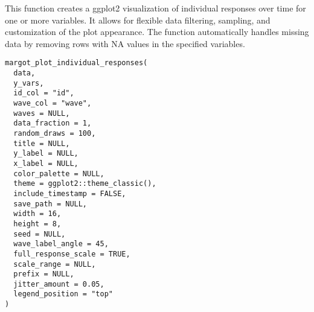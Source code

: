 \documentclass[a4paper]{book}
\begin{document}
%
\begin{Description}
This function creates a ggplot2 visualization of individual responses over time for one or more variables.
It allows for flexible data filtering, sampling, and customization of the plot appearance.
The function automatically handles missing data by removing rows with NA values in the specified variables.
\end{Description}
%
\begin{Usage}
\begin{verbatim}
margot_plot_individual_responses(
  data,
  y_vars,
  id_col = "id",
  wave_col = "wave",
  waves = NULL,
  data_fraction = 1,
  random_draws = 100,
  title = NULL,
  y_label = NULL,
  x_label = NULL,
  color_palette = NULL,
  theme = ggplot2::theme_classic(),
  include_timestamp = FALSE,
  save_path = NULL,
  width = 16,
  height = 8,
  seed = NULL,
  wave_label_angle = 45,
  full_response_scale = TRUE,
  scale_range = NULL,
  prefix = NULL,
  jitter_amount = 0.05,
  legend_position = "top"
)
\end{verbatim}
\end{Usage}
%
\end{document}
